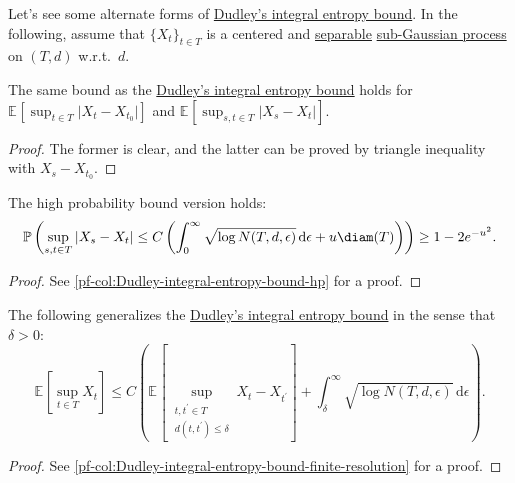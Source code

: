 Let's see some alternate forms of \hyperref[col:Dudley-integral-entropy-bound]{Dudley's integral entropy bound}. In the following, assume that \(\{ X_t \} _{t\in T}\) is a centered and \hyperref[def:separable]{separable} \hyperref[def:sub-Gaussian-process]{sub-Gaussian process} on \((T, d)\) w.r.t.\ \(d\).

\begin{corollary}\label{col:Dudley-integral-entropy-bound-difference}
	The same bound as the \hyperref[col:Dudley-integral-entropy-bound]{Dudley's integral entropy bound} holds for \(\mathbb{E}_{}\left[\sup _{t\in T} \vert X_t - X_{t_0} \vert \right]\) and \(\mathbb{E}_{}\left[\sup _{s, t\in T} \vert X_s - X_t \vert \right]\).
\end{corollary}
\begin{proof}
	The former is clear, and the latter can be proved by triangle inequality with \(X_s - X_{t_0}\).
\end{proof}

\begin{corollary}\label{col:Dudley-integral-entropy-bound-hp}
	The high probability bound version holds:
	\[
		\mathbb{P} \left(
		\sup _{s, t\in T} \vert X_s - X_t \vert
		\leq C \left( \int_{0}^{\infty} \sqrt{\log N(T, d, \epsilon )}  \,\mathrm{d}\epsilon + u \diam(T) \right)
		\right) \geq 1 - 2 e^{-u^2}.
	\]
\end{corollary}
\begin{proof}
	See \autoref{pf-col:Dudley-integral-entropy-bound-hp} for a proof.
\end{proof}

\begin{corollary}\label{col:Dudley-integral-entropy-bound-finite-resolution}
	The following generalizes the \hyperref[col:Dudley-integral-entropy-bound]{Dudley's integral entropy bound} in the sense that \(\delta > 0\):
	\[
		\mathbb{E}_{}\left[\sup _{t\in T} X_t \right]
		\leq C  \left( \mathbb{E}_{}\left[ \sup _{\substack{t, t^{\prime} \in T \\ d(t, t^{\prime} ) \leq \delta }} X_t - X_{t^{\prime} } \right] + \int_{\delta }^{\infty} \sqrt{\log N(T, d, \epsilon )} \,\mathrm{d}\epsilon \right) .
	\]
\end{corollary}
\begin{proof}
	See \autoref{pf-col:Dudley-integral-entropy-bound-finite-resolution} for a proof.
\end{proof}

